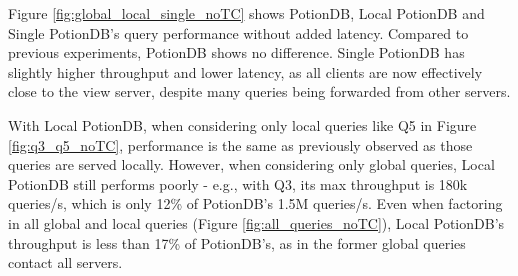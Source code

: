 \documentclass[sigconf, nonacm]{acmart}
\begin{document}
Figure \ref{fig:global_local_single_noTC} shows PotionDB, Local PotionDB and Single PotionDB's query performance without added latency.
Compared to previous experiments, PotionDB shows no difference.
Single 
PotionDB has slightly higher throughput and lower latency, as all clients are now effectively close to the view server, despite many queries being forwarded from other servers. %

With Local PotionDB, when considering only local queries like Q5 in Figure \ref{fig:q3_q5_noTC}, performance is the same as previously observed as those queries are served locally.
However, when considering only global queries, Local PotionDB still performs poorly - e.g., with Q3, its max throughput is 180k queries/s, which is only 12\% of PotionDB's 1.5M queries/s.
Even when factoring in all global and local queries (Figure \ref{fig:all_queries_noTC}), Local PotionDB's throughput is less than 17\% of PotionDB's, as in the former global queries contact all servers.
\end{document}
